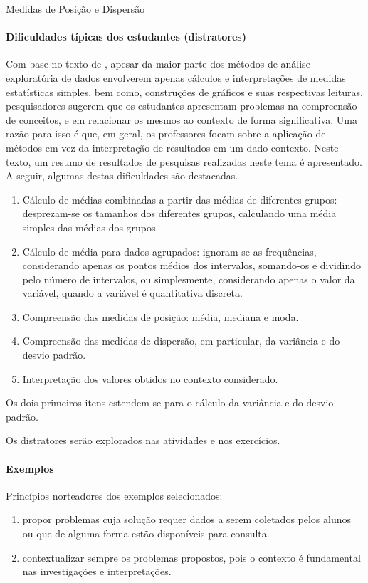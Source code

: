\begin{apresentacao}{Medidas de Posição e Dispersão}
\paragraph{Dificuldades típicas dos estudantes (distratores)}

Com base no texto de \citet{batanero2016}, apesar da maior parte dos métodos de análise exploratória de dados envolverem apenas cálculos e interpretações de medidas estatísticas simples, bem como, construções de gráficos e suas respectivas leituras, pesquisadores sugerem que os estudantes apresentam problemas na compreensão de conceitos, e em relacionar os mesmos ao contexto de forma significativa. Uma razão para isso é que, em geral, os professores focam sobre a aplicação de métodos em vez da interpretação de resultados em um dado contexto. Neste texto, um resumo de resultados de pesquisas realizadas neste tema é apresentado. A seguir, algumas destas dificuldades são destacadas.

\begin{enumerate}
\item Cálculo de médias combinadas a partir das médias de diferentes grupos: desprezam-se os tamanhos dos diferentes grupos, calculando uma média simples das médias dos grupos.
\item Cálculo de média para dados agrupados: ignoram-se as frequências, considerando apenas os pontos médios dos intervalos, somando-os e dividindo pelo número de intervalos, ou simplesmente, considerando apenas o valor da variável, quando a variável é quantitativa discreta.
\item Compreensão das medidas de posição: média, mediana e moda.
\item Compreensão das medidas de dispersão, em particular, da variância e do desvio padrão.
\item Interpretação dos valores obtidos no contexto considerado.
\end{enumerate}

Os dois primeiros itens estendem-se para o cálculo da variância e do desvio padrão.

Os distratores serão explorados nas atividades e nos exercícios.

\paragraph{Exemplos}

Princípios norteadores dos exemplos selecionados:

\begin{enumerate}
\item propor problemas cuja solução requer dados a serem coletados pelos alunos ou que de alguma forma estão disponíveis para consulta.
\item contextualizar sempre os problemas propostos, pois o contexto é fundamental nas investigações e interpretações.
\end{enumerate}

\end{apresentacao}
